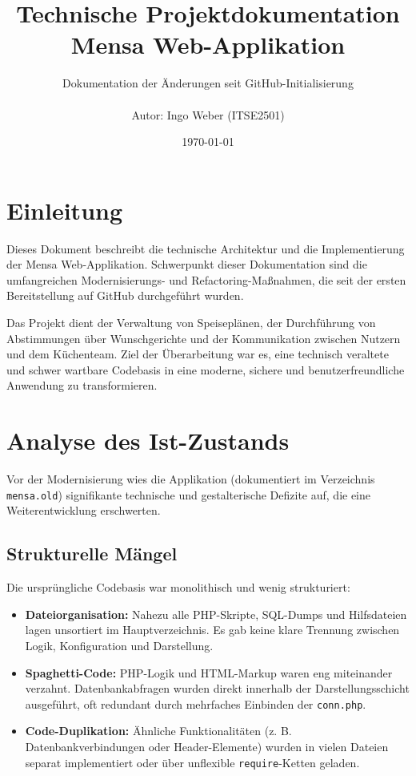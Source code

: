 \documentclass[11pt,
a4paper,
numbers=nonperiod,
footsepline,
oneside,
numbers=noenddot,
bibliography=totoc
]{scrreprt}
\title{Technische Projektdokumentation \\ \Large Mensa Web-Applikation}
\author{Dokumentation der Änderungen seit GitHub-Initialisierung \\\\ Autor: Ingo Weber (ITSE2501)}
\date{\today}
\begin{document}
\maketitle
\tableofcontents

\chapter{Einleitung}
Dieses Dokument beschreibt die technische Architektur und die Implementierung der Mensa Web-Applikation. Schwerpunkt dieser Dokumentation sind die umfangreichen Modernisierungs- und Refactoring-Maßnahmen, die seit der ersten Bereitstellung auf GitHub durchgeführt wurden.

Das Projekt dient der Verwaltung von Speiseplänen, der Durchführung von Abstimmungen über Wunschgerichte und der Kommunikation zwischen Nutzern und dem Küchenteam. Ziel der Überarbeitung war es, eine technisch veraltete und schwer wartbare Codebasis in eine moderne, sichere und benutzerfreundliche Anwendung zu transformieren.

\chapter{Analyse des Ist-Zustands}
Vor der Modernisierung wies die Applikation (dokumentiert im Verzeichnis \texttt{mensa.old}) signifikante technische und gestalterische Defizite auf, die eine Weiterentwicklung erschwerten.

\section{Strukturelle Mängel}
Die ursprüngliche Codebasis war monolithisch und wenig strukturiert:
\begin{itemize}
    \item \textbf{Dateiorganisation:} Nahezu alle PHP-Skripte, SQL-Dumps und Hilfsdateien lagen unsortiert im Hauptverzeichnis. Es gab keine klare Trennung zwischen Logik, Konfiguration und Darstellung.
    \item \textbf{Spaghetti-Code:} PHP-Logik und HTML-Markup waren eng miteinander verzahnt. Datenbankabfragen wurden direkt innerhalb der Darstellungsschicht ausgeführt, oft redundant durch mehrfaches Einbinden der \texttt{conn.php}.
    \item \textbf{Code-Duplikation:} Ähnliche Funktionalitäten (z. B. Datenbankverbindungen oder Header-Elemente) wurden in vielen Dateien separat implementiert oder über unflexible \texttt{require}-Ketten geladen.
\end{itemize}
\end{document}
